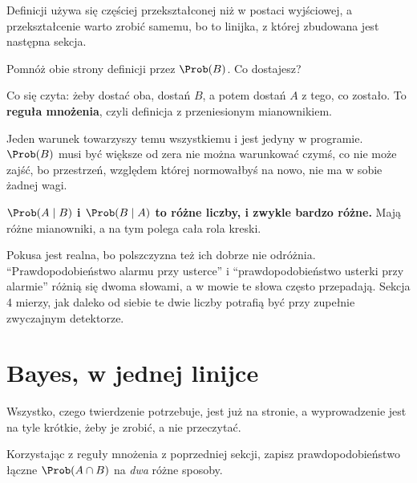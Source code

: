 \begin{fr}
Definicji używa się częściej przekształconej niż w postaci wyjściowej, a
przekształcenie warto zrobić samemu, bo to linijka, z której zbudowana jest
następna sekcja.

Pomnóż obie strony definicji przez $\Prob(B)$. Co dostajesz?
\dotline
\nextframe
\end{fr}

\begin{fr}

Co się czyta: żeby dostać oba, dostań $B$, a potem dostań $A$ z tego, co
zostało. To \textbf{reguła mnożenia}, czyli definicja z przeniesionym
mianownikiem.

Jeden warunek towarzyszy temu wszystkiemu i jest jedyny w programie.
$\Prob(B)$ musi być większe od zera \dash{} nie można warunkować czymś, co nie
może zajść, bo przestrzeń, względem której normowałbyś na nowo, nie ma w sobie
żadnej wagi.

\begin{trapbox}
\textbf{$\Prob(A \mid B)$ i $\Prob(B \mid A)$ to różne liczby, i zwykle bardzo
różne.} Mają różne mianowniki, a na tym polega cała rola kreski.

Pokusa jest realna, bo polszczyzna też ich dobrze nie odróżnia.
\enquote{Prawdopodobieństwo alarmu przy usterce} i \enquote{prawdopodobieństwo
usterki przy alarmie} różnią się dwoma słowami, a w mowie te słowa często
przepadają. Sekcja 4 mierzy, jak daleko od siebie te dwie liczby potrafią być
przy zupełnie zwyczajnym detektorze.
\end{trapbox}

\end{fr}

\section{Bayes, w jednej linijce}
\label{sec:P23-bayes}

\begin{fr}
Wszystko, czego twierdzenie potrzebuje, jest już na stronie, a wyprowadzenie
jest na tyle krótkie, żeby je zrobić, a nie przeczytać.

Korzystając z reguły mnożenia z poprzedniej sekcji, zapisz prawdopodobieństwo
łączne $\Prob(A \cap B)$ na \emph{dwa} różne sposoby.
\dotline
\nextframe
\end{fr}


